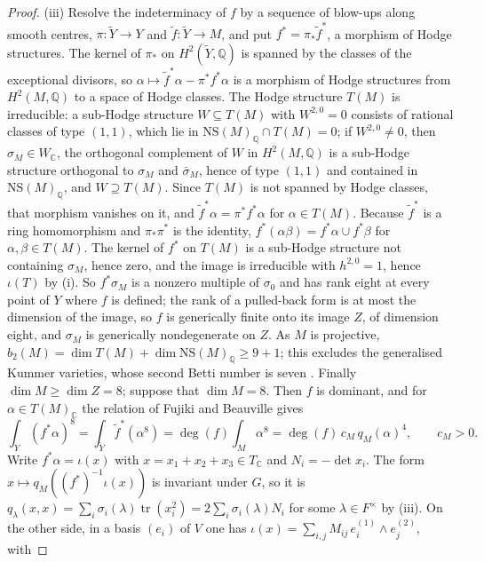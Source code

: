 \documentclass[11pt,reqno]{amsart}
\theoremstyle{plain}
\theoremstyle{definition}
\theoremstyle{remark}
\newcommand{\QQ}{\mathbb{Q}}
\newcommand{\CC}{\mathbb{C}}
\newcommand{\NS}{\mathrm{NS}}
\begin{document}
\begin{proof}
(iii) Resolve the indeterminacy of $f$ by a sequence of blow-ups along
smooth centres, $\pi\colon\tilde{Y}\to Y$ and $\tilde{f}\colon\tilde{Y}\to M$,
and put $f^{*}=\pi_{*}\tilde{f}^{*}$, a morphism of Hodge structures. The
kernel of $\pi_{*}$ on $H^{2}(\tilde{Y},\QQ)$ is spanned by the classes of
the exceptional divisors, so $\alpha\mapsto\tilde{f}^{*}\alpha-
\pi^{*}f^{*}\alpha$ is a morphism of Hodge structures from $H^{2}(M,\QQ)$ to a
space of Hodge classes. The Hodge structure $T(M)$ is irreducible: a
sub-Hodge structure $W\subseteq T(M)$ with $W^{2,0}=0$ consists of rational
classes of type $(1,1)$, which lie in $\NS(M)_{\QQ}\cap T(M)=0$; if
$W^{2,0}\ne0$, then $\sigma_{M}\in W_{\CC}$, the orthogonal complement of $W$
in $H^{2}(M,\QQ)$ is a sub-Hodge structure orthogonal to $\sigma_{M}$ and
$\bar{\sigma}_{M}$, hence of type $(1,1)$ and contained in $\NS(M)_{\QQ}$,
and $W\supseteq T(M)$. Since $T(M)$ is not spanned by Hodge classes, that
morphism vanishes on it, and $\tilde{f}^{*}\alpha=\pi^{*}f^{*}\alpha$ for
$\alpha\in T(M)$. Because $\tilde{f}^{*}$ is a ring homomorphism and
$\pi_{*}\pi^{*}$ is the identity, $f^{*}(\alpha\beta)=f^{*}\alpha\cup
f^{*}\beta$ for $\alpha,\beta\in T(M)$. The kernel of $f^{*}$ on $T(M)$ is a
sub-Hodge structure not containing $\sigma_{M}$, hence zero, and the image is
irreducible with $h^{2,0}=1$, hence $\iota(T)$ by (i). So $f^{*}\sigma_{M}$ is
a nonzero multiple of $\sigma_{0}$ and has rank eight at every point of $Y$
where $f$ is defined; the rank of a pulled-back form is at most the dimension
of the image, so $f$ is generically finite onto its image $Z$, of dimension
eight, and $\sigma_{M}$ is generically nondegenerate on $Z$. As $M$ is
projective, $b_{2}(M)=\dim T(M)+\dim\NS(M)_{\QQ}\ge9+1$; this excludes the
generalised Kummer varieties, whose second Betti number is seven
\cite{Bea83}. Finally $\dim M\ge\dim Z=8$; suppose that $\dim M=8$. Then
$f$ is dominant, and for $\alpha\in T(M)_{\CC}$ the relation of Fujiki and
Beauville \cite{Bea83,Fuj87} gives
\[
  \int_{Y}(f^{*}\alpha)^{8}=\int_{\tilde{Y}}\tilde{f}^{*}(\alpha^{8})
  =\deg(f)\int_{M}\alpha^{8}=\deg(f)\,c_{M}\,q_{M}(\alpha)^{4},
  \qquad c_{M}>0 .
\]
Write $f^{*}\alpha=\iota(x)$ with $x=x_{1}+x_{2}+x_{3}\in T_{\CC}$ and
$N_{i}=-\det x_{i}$. The form $x\mapsto q_{M}((f^{*})^{-1}\iota(x))$ is
invariant under $G$, so it is $q_{\lambda}(x,x)=
\sum_{i}\sigma_{i}(\lambda)\operatorname{tr}(x_{i}^{2})=
2\sum_{i}\sigma_{i}(\lambda)N_{i}$ for some $\lambda\in F^{\times}$ by
(iii). On the other side, in a basis $(e_{i})$ of
$V$ one has $\iota(x)=\sum_{i,j}M_{ij}\,e_{i}^{(1)}\wedge e_{j}^{(2)}$, with

\end{proof}
\end{document}
